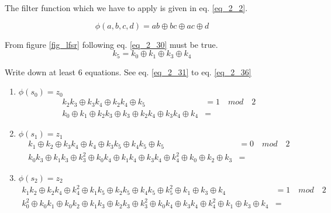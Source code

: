 \documentclass[11pt]{article}
\begin{document}
The filter function which we have to apply is given in eq. \ref{eq_2_2}. 

\begin{equation}
\phi(a,b,c,d) = ab \oplus bc \oplus ac \oplus d
\label{eq_2_2}
\end{equation}



From figure \ref{fig_lfsr} following eq. \ref{eq_2_30} must be true. 
\begin{equation}
k_5 = k_0  \oplus k_1  \oplus k_3  \oplus k_4
\label{eq_2_30}
\end{equation}

Write down at least 6 equations. See eq. \ref{eq_2_31} to eq. \ref{eq_2_36}
\begin{enumerate}
\item $\phi(s_0) = z_0$
\begin{equation}
\begin{align}
k_2k_3 \oplus k_3k_4 \oplus k_2k_4 \oplus k_5 &= 1 \quad mod \quad 2 \\
k_0 \oplus k_1 \oplus k_2 k_3 \oplus k_3 \oplus k_2 k_4 \oplus k_3 k_4 \oplus k_4 &=
\end{align}
\label{eq_2_31}
\end{equation}

\item $\phi(s_1) = z_1$
\begin{equation}
\begin{align}
k_1 \oplus k_2 \oplus k_3 k_4 \oplus k_4 \oplus k_3 k_5 \oplus k_4 k_5 \oplus k_5 &= 0 \quad mod \quad 2 \\
k_0k_3 \oplus k_1k_3 \oplus k_3^2 \oplus k_0k_4 \oplus k_1k_4 \oplus k_3k_4 \oplus k_4^2 \oplus k_0 \oplus k_2 \oplus k_3 &=
\end{align}
\label{eq_2_32}
\end{equation}

\item $\phi(s_2) = z_2$
\begin{equation}
\begin{align}
k_1k_2 \oplus k_2k_4 \oplus k_4^2 \oplus k_1k_5 \oplus k_2k_5 \oplus k_4k_5 \oplus k_5^2 \oplus k_1 \oplus k_3 \oplus k_4 &= 1 \quad mod \quad 2 \\
k_0^2 \oplus k_0k_1 \oplus k_0k_2 \oplus k_1k_3 \oplus k_2k_3 \oplus k_3^2 \oplus k_0k_4 \oplus k_3k_4 \oplus k_4^2 \oplus k_1 \oplus k_3 \oplus k_4&=
\end{align}
\label{eq_2_33}
\end{equation}




\end{enumerate}
\end{document}
